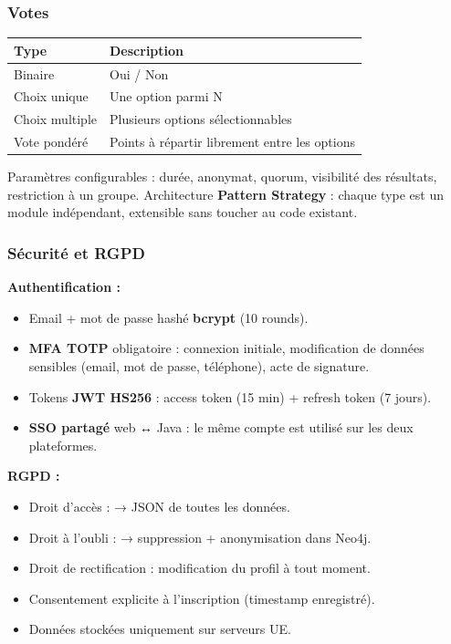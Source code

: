 \documentclass[12pt,a4paper]{article}
\begin{document}
\subsubsection{Votes}

\begin{center}
    \renewcommand{\arraystretch}{1.4}
    \begin{tabularx}{\linewidth}{p{3.5cm} X}
        \textbf{Type}  & \textbf{Description}                          \\
        \midrule
        \rowcolor{rowalt}
        Binaire        & Oui / Non                                     \\
        Choix unique   & Une option parmi N                            \\
        \rowcolor{rowalt}
        Choix multiple & Plusieurs options sélectionnables             \\
        Vote pondéré   & Points à répartir librement entre les options \\
    \end{tabularx}
\end{center}

\vspace{5pt}

Paramètres configurables : durée, anonymat, quorum, visibilité des résultats,
restriction à un groupe. Architecture \textbf{Pattern Strategy} : chaque type est
un module indépendant, extensible sans toucher au code existant.

\subsubsection{Sécurité et RGPD}

\textbf{Authentification :}
\begin{itemize}
    \item Email + mot de passe hashé \textbf{bcrypt} (10 rounds).
    \item \textbf{MFA TOTP} obligatoire : connexion initiale, modification de données
          sensibles (email, mot de passe, téléphone), acte de signature.
    \item Tokens \textbf{JWT HS256} : access token (15 min) + refresh token (7 jours).
    \item \textbf{SSO partagé} web ↔ Java : le même compte est utilisé sur les deux
          plateformes.
\end{itemize}

\textbf{RGPD :}
\begin{itemize}
    \item Droit d'accès :  → JSON de toutes les données.
    \item Droit à l'oubli :  → suppression + anonymisation
          dans Neo4j.
    \item Droit de rectification : modification du profil à tout moment.
    \item Consentement explicite à l'inscription (timestamp enregistré).
    \item Données stockées uniquement sur serveurs UE.
\end{itemize}
\end{document}
